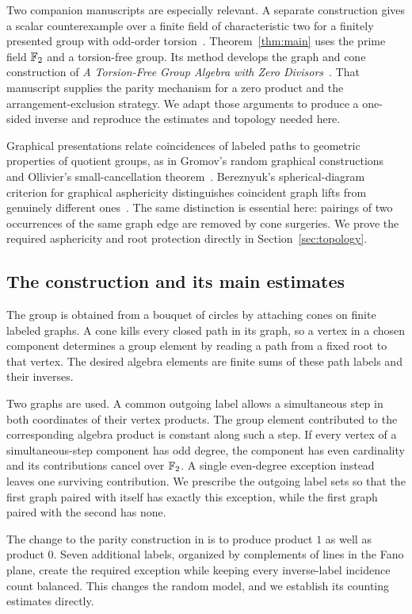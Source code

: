 Two companion manuscripts are especially relevant. A separate construction
gives a scalar counterexample over a finite field of characteristic two for
a finitely presented group with odd-order torsion~\cite[Theorem~1.1]{OpenAI2026DF}.
Theorem~\ref{thm:main} uses the prime field $\mathbb F_2$ and a torsion-free group.
Its method develops the graph and cone construction of
\emph{A Torsion-Free Group Algebra with Zero Divisors}~\cite{OpenAI2026ZD}.
That manuscript supplies the parity mechanism for a zero product and the
arrangement-exclusion strategy. We adapt those arguments to produce a
one-sided inverse and reproduce the estimates and topology needed here.

Graphical presentations relate coincidences of labeled paths to geometric
properties of quotient groups, as in Gromov's random graphical
constructions~\cite{Gromov2003} and Ollivier's small-cancellation
theorem~\cite{Ollivier2006}. Bereznyuk's spherical-diagram criterion for
graphical asphericity distinguishes coincident graph lifts from genuinely
different ones~\cite{Bereznyuk2019}. The same distinction is essential here:
pairings of two occurrences of the same graph edge are removed by cone
surgeries. We prove the required asphericity and root protection directly in
Section~\ref{sec:topology}.

\subsection*{The construction and its main estimates}
The group is obtained from a bouquet of circles by attaching cones on finite
labeled graphs. A cone kills every closed path in its graph, so a vertex in a
chosen component determines a group element by reading a path from a fixed
root to that vertex. The desired algebra elements are finite sums of these
path labels and their inverses.

Two graphs are used. A common outgoing label allows a simultaneous step in
both coordinates of their vertex products. The group element contributed to
the corresponding algebra product is constant along such a step. If every
vertex of a simultaneous-step component has odd degree, the component has
even cardinality and its contributions cancel over $\mathbb F_2$. A single
even-degree exception instead leaves one surviving contribution. We prescribe
the outgoing label sets so that the first graph paired with itself has exactly
this exception, while the first graph paired with the second has none.

The change to the parity construction in \cite{OpenAI2026ZD} is to produce
product $1$ as well as product $0$. Seven additional labels, organized by complements of
lines in the Fano plane, create the required exception while keeping every
inverse-label incidence count balanced. This changes the random model, and
we establish its counting estimates directly.

